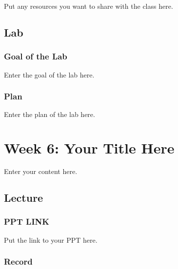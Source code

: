 \documentclass[
  letterpaper,
  oneside]{book}
\numberwithin{equation}{section}
\numberwithin{figure}{section}
\theoremstyle{break}
\begin{document}

Put any resources you want to share with the class here.

\chapter*{Lab}\label{lab-4}


\section*{Goal of the Lab}\label{goal-of-the-lab-4}


Enter the goal of the lab here.

\section*{Plan}\label{plan-4}


Enter the plan of the lab here.

\part{Week 6: Your Title Here}

Enter your content here.

\chapter*{Lecture}\label{lecture-5}


\section*{PPT LINK}\label{ppt-link-5}


Put the link to your PPT here.

\section*{Record}\label{record-5}
\end{document}
